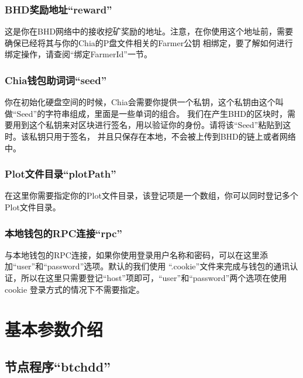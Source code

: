 \subsubsection{BHD奖励地址``reward''}
\begin{flushleft}
    这是你在BHD网络中的接收挖矿奖励的地址。注意，在你使用这个地址前，需要确保已经将其与你的Chia的P盘文件相关的Farmer公钥
    相绑定，要了解如何进行绑定操作，请查阅``绑定FarmerId''一节。
\end{flushleft}
\subsubsection{Chia钱包助词词``seed''}
\begin{flushleft}
    你在初始化硬盘空间的时候，Chia会需要你提供一个私钥，这个私钥由这个叫做``Seed''的字符串组成，里面是一些单词的组合。
    我们在产生BHD的区块时，需要用到这个私钥来对区块进行签名，用以验证你的身份。请将该``Seed''粘贴到这时。该私钥只用于签名，
    并且只保存在本地，不会被上传到BHD的链上或者网络中。
\end{flushleft}
\subsubsection{Plot文件目录``plotPath''}
\begin{flushleft}
    在这里你需要指定你的Plot文件目录，该登记项是一个数组，你可以同时登记多个Plot文件目录。
\end{flushleft}
\subsubsection{本地钱包的RPC连接``rpc''}
\begin{flushleft}
    与本地钱包的RPC连接，如果你使用登录用户名称和密码，可以在这里添加``user''和``password''选项。默认的我们使用
    ``.cookie''文件来完成与钱包的通讯认证，所以在这里只需要登记``host''项即可，``user''和``password''两个选项在使用cookie
    登录方式的情况下不需要指定。
\end{flushleft}
\section{基本参数介绍}
\subsection{节点程序``btchdd''}
